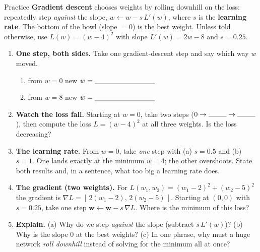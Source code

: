 \documentclass[10pt]{article}
\newcommand{\ww}{\mathbf{w}}
\begin{document}
\namedateperiod

\vspace{0.12in}

\begin{notesbox}{Practice}
\textbf{Gradient descent} chooses weights by rolling downhill on the loss: repeatedly step \emph{against} the
slope, $w\leftarrow w-s\,L'(w)$, where $s$ is the \textbf{learning rate}. The bottom of the bowl (slope $=0$)
is the best weight. Unless told otherwise, use $L(w)=(w-4)^2$ with slope $L'(w)=2w-8$ and $s=0.25$.

\begin{enumerate}[leftmargin=1.9em, itemsep=11pt]
  \item \textbf{One step, both sides.} Take one gradient-descent step and say which way $w$ moved.
    \begin{enumerate}[label=(\alph*), leftmargin=1.8em, itemsep=4pt]
      \item from $w=0$ \hfill new $w=\underline{\hspace{3.0cm}}$
      \item from $w=8$ \hfill new $w=\underline{\hspace{3.0cm}}$
    \end{enumerate}
    \vspace{0.35cm}
  \item \textbf{Watch the loss fall.} Starting at $w=0$, take two steps ($0\to\rule{0.9cm}{0.4pt}\to\rule{0.9cm}{0.4pt}$),
        then compute the loss $L=(w-4)^2$ at all three weights. Is the loss decreasing? 
  \item \textbf{The learning rate.} From $w=0$, take \emph{one} step with (a) $s=0.5$ and (b) $s=1$. One lands
        exactly at the minimum $w=4$; the other overshoots. State both results and, in a sentence, what too big
        a learning rate does. 
  \item \textbf{The gradient (two weights).} For $L(w_1,w_2)=(w_1-2)^2+(w_2-5)^2$ the gradient is
        $\nabla L=[\,2(w_1-2),\,2(w_2-5)\,]$. Starting at $(0,0)$ with $s=0.25$, take one step
        $\ww\leftarrow\ww-s\,\nabla L$. Where is the minimum of this loss? 
  \item \textbf{Explain.} (a) Why do we step \emph{against} the slope (subtract $s\,L'(w)$)? (b) Why is the
        slope $0$ at the best weights? (c) In one phrase, why must a huge network \emph{roll downhill} instead
        of solving for the minimum all at once? 
\end{enumerate}
\end{notesbox}
\end{document}
